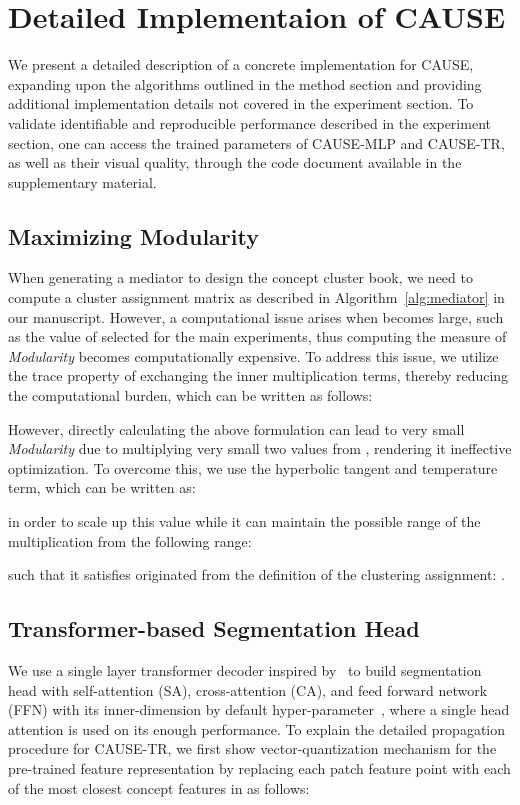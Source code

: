 \documentclass{article} \usepackage{iclr2024_conference,times}
\begin{document}
\section{Detailed Implementaion of CAUSE}
\label{appendix:B}
We present a detailed description of a concrete implementation for CAUSE, expanding upon the algorithms outlined in the method section and providing additional implementation details not covered in the experiment section. To validate identifiable and reproducible performance described in the experiment section, one can access the trained parameters of CAUSE-MLP and CAUSE-TR, as well as their visual quality, through the code document available in the supplementary material.


\subsection{Maximizing Modularity}

When generating a mediator to design the concept cluster book, we need to compute a cluster assignment matrix  as described in Algorithm~\ref{alg:mediator} in our manuscript. However, a computational issue arises when  becomes large, such as the value of  selected for the main experiments, thus computing the measure of \textit{Modularity}  becomes computationally expensive. To address this issue, we utilize the trace property of exchanging the inner multiplication terms, thereby reducing the computational burden, which can be written as follows:

However, directly calculating the above formulation can lead to very small \textit{Modularity} due to multiplying very small two values from , rendering it ineffective optimization. To overcome this, we use the hyperbolic tangent and temperature term, which can be written as:

in order to scale up this value while it can maintain the possible range of the multiplication  from the following range:

such that it satisfies  originated from the definition of the clustering assignment: .



\subsection{Transformer-based Segmentation Head}

We use a single layer transformer decoder inspired by~\citet{vaswani2017attention, carion2020end} to build segmentation head with self-attention (SA), cross-attention (CA), and feed forward network (FFN) with its  inner-dimension by default hyper-parameter~\citep{vaswani2017attention}, where a single head attention is used on its enough performance. To explain the detailed propagation procedure for CAUSE-TR, we first show vector-quantization mechanism for the pre-trained feature representation  by replacing each patch feature point  with each of the most closest concept features in  as follows:
\end{document}

